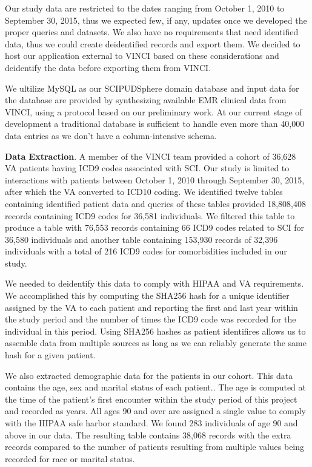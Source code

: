 \documentclass{amia}
\begin{document}
Our study data are restricted to the dates ranging from October 1, 2010 to September 30, 2015, thus we expected few, if any, updates once we developed the proper queries and datasets.  We also have no requirements that need identified data, thus we could create deidentified records and export them.  We decided to host our application external to VINCI based on these considerations and deidentify the data before exporting them from VINCI.

We ultilize MySQL as our SCIPUDSphere domain database and input data for the database are provided by synthesizing available EMR clinical data from VINCI, using a protocol based on our preliminary work. At our current stage of development a traditional database is sufficient to handle even more than 40,000 data entries as we don't have a column-intensive schema.

{\bf Data Extraction}. A member of the VINCI team provided a cohort of 36,628 VA patients having ICD9 codes associated with SCI.  Our study is limited to interactions with patients between October 1, 2010 through September 30, 2015, after which the VA converted to ICD10 coding.  We identified twelve tables containing identified patient data and queries of these tables provided 18,808,408 records containing ICD9 codes for 36,581 individuals.  We filtered this table to produce a table with 76,553 records containing 66 ICD9 codes related to SCI for 36,580 individuals and another table containing 153,930 records of 32,396 individuals with a total of 216 ICD9 codes for comorbidities included in our study.

We needed to deidentify this data to comply with HIPAA and VA requirements.  We accomplished this by computing the SHA256 hash for a unique identifier assigned by the VA to each patient and reporting the first and last year within the study period and the number of times the ICD9 code was recorded for the individual in this period.  Using SHA256 hashes as patient identifires allows us to assemble data from multiple sources as long as we can reliably generate the same hash for a given patient.

We also extracted demographic data for the patients in our cohort.  This data contains the age, sex and marital status of each patient..  The age is computed at the time of the patient's first encounter within the study period of this project and recorded as years.  All ages 90 and over are assigned a single value to comply with the HIPAA safe harbor standard.  We found 283 individuals of age 90 and above in our data. The resulting table contains 38,068 records with the extra records compared to the number of patients resulting from multiple values being recorded for race or marital status.
\end{document}
